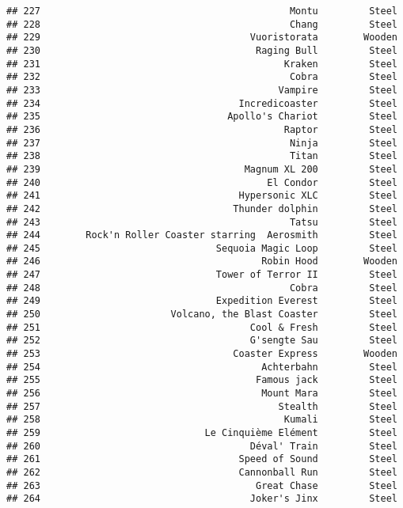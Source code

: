 \documentclass[
]{article}
\begin{document}
\begin{verbatim}
## 227                                            Montu         Steel
## 228                                            Chang         Steel
## 229                                     Vuoristorata        Wooden
## 230                                      Raging Bull         Steel
## 231                                           Kraken         Steel
## 232                                            Cobra         Steel
## 233                                          Vampire         Steel
## 234                                   Incredicoaster         Steel
## 235                                 Apollo's Chariot         Steel
## 236                                           Raptor         Steel
## 237                                            Ninja         Steel
## 238                                            Titan         Steel
## 239                                    Magnum XL 200         Steel
## 240                                        El Condor         Steel
## 241                                   Hypersonic XLC         Steel
## 242                                  Thunder dolphin         Steel
## 243                                            Tatsu         Steel
## 244        Rock'n Roller Coaster starring  Aerosmith         Steel
## 245                               Sequoia Magic Loop         Steel
## 246                                       Robin Hood        Wooden
## 247                               Tower of Terror II         Steel
## 248                                            Cobra         Steel
## 249                               Expedition Everest         Steel
## 250                       Volcano, the Blast Coaster         Steel
## 251                                     Cool & Fresh         Steel
## 252                                     G'sengte Sau         Steel
## 253                                  Coaster Express        Wooden
## 254                                       Achterbahn         Steel
## 255                                      Famous jack         Steel
## 256                                       Mount Mara         Steel
## 257                                          Stealth         Steel
## 258                                           Kumali         Steel
## 259                             Le Cinquième Elément         Steel
## 260                                     Déval' Train         Steel
## 261                                   Speed of Sound         Steel
## 262                                   Cannonball Run         Steel
## 263                                      Great Chase         Steel
## 264                                     Joker's Jinx         Steel

\end{verbatim}
\end{document}
